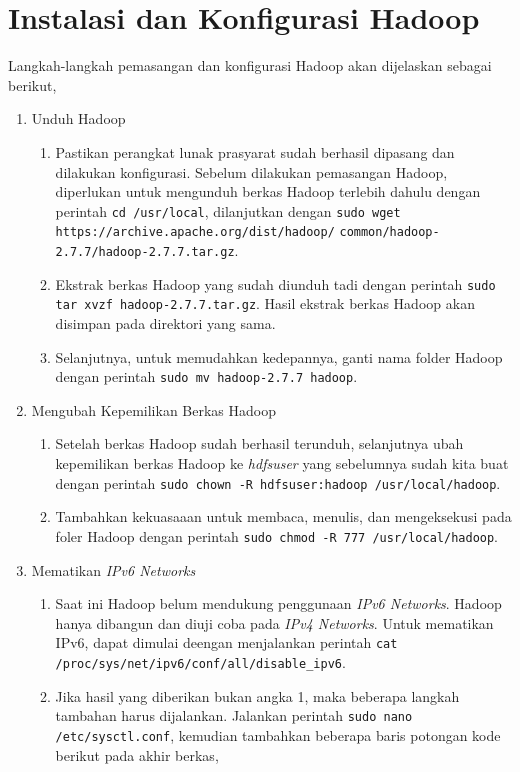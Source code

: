 \chapter{Instalasi dan Konfigurasi Hadoop}
\label{appendix:C}

Langkah-langkah pemasangan dan konfigurasi Hadoop akan dijelaskan sebagai berikut,

\begin{enumerate}
  \item Unduh Hadoop
  \begin{enumerate}
    \item Pastikan perangkat lunak prasyarat sudah berhasil dipasang dan dilakukan konfigurasi. Sebelum dilakukan pemasangan Hadoop, diperlukan untuk mengunduh berkas Hadoop terlebih dahulu dengan perintah \verb|cd /usr/local|, dilanjutkan dengan \verb|sudo wget https://archive.apache.org/dist/hadoop/|
    \newline \verb|common/hadoop-2.7.7/hadoop-2.7.7.tar.gz|.
    \item Ekstrak berkas Hadoop yang sudah diunduh tadi dengan perintah \verb|sudo tar xvzf hadoop-2.7.7.tar.gz|. Hasil ekstrak berkas Hadoop akan disimpan pada direktori yang sama.
    \item Selanjutnya, untuk memudahkan kedepannya, ganti nama folder Hadoop dengan perintah \verb|sudo mv hadoop-2.7.7 hadoop|.
  \end{enumerate}
  \item Mengubah Kepemilikan Berkas Hadoop
  \begin{enumerate}
    \item Setelah berkas Hadoop sudah berhasil terunduh, selanjutnya ubah kepemilikan berkas Hadoop ke \textit{hdfsuser} yang sebelumnya sudah kita buat dengan perintah \verb|sudo chown -R hdfsuser:hadoop /usr/local/hadoop|.
    \item Tambahkan kekuasaaan untuk membaca, menulis, dan mengeksekusi pada foler Hadoop dengan perintah \verb|sudo chmod -R 777 /usr/local/hadoop|.
  \end{enumerate}
  \item Mematikan \textit{IPv6 Networks}
  \begin{enumerate}
    \item Saat ini Hadoop belum mendukung penggunaan \textit{IPv6 Networks}. Hadoop hanya dibangun dan diuji coba pada \textit{IPv4 Networks}. Untuk mematikan IPv6, dapat dimulai deengan menjalankan perintah \verb|cat /proc/sys/net/ipv6/conf/all/disable_ipv6|.
    \item Jika hasil yang diberikan bukan angka 1, maka beberapa langkah tambahan harus dijalankan. Jalankan perintah \verb|sudo nano /etc/sysctl.conf|, kemudian tambahkan beberapa baris potongan kode berikut pada akhir berkas,

\end{enumerate}
\end{enumerate}
